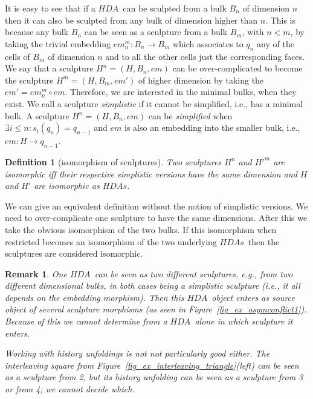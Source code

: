 \documentclass[submission,copyright,creativecommons]{eptcs}
\newtheorem{definition}[theorem]{Definition}
\newtheorem{remark}[theorem]{Remark}
\newcounter{case}
\newcommand\HDA{\ensuremath{\mathit{HDA}}}
\newcommand\HDAs{\ensuremath{\mathit{HDAs}}}
\newcommand\sculpture[2]{\ensuremath{#1^{#2}}}
\newcommand\embedMorphism{\ensuremath{\mathit{em}}}
\begin{document}
It is easy to see that if a \HDA\ can be sculpted from a bulk $B_{n}$ of dimension $n$ then it can also be sculpted from any bulk of dimension higher than $n$. This is because any bulk $B_{n}$ can be seen as a sculpture from a bulk $B_{m}$, with $n<m$, by taking the trivial embedding $\embedMorphism^{m}_{n}:B_{n}\rightarrow B_{m}$ which associates to $q_{n}$ any of the cells of $B_{m}$ of dimension $n$ and to all the other cells just the corresponding faces. We say that a sculpture $\sculpture{H}{n}=(H,B_{n},\embedMorphism)$ can be over-complicated to become the sculpture $\sculpture{H}{m}=(H,B_{m},\embedMorphism')$ of higher dimension by taking the $\embedMorphism'=\embedMorphism^{m}_{n}\circ\embedMorphism$.
Therefore, we are interested in the minimal bulks, when they exist. We call a sculpture \emph{simplistic} if it cannot be simplified, i.e., has a minimal bulk. A sculpture $\sculpture{H}{n}=(H,B_{n},\embedMorphism)$ can be \emph{simplified} when $\exists i\leq n: s_{i}(q_{n})=q_{n-1}$ and $\embedMorphism$ is also an embedding into the smaller bulk, i.e., $\embedMorphism:H\rightarrow q_{n-1}$.


\begin{definition}[isomorphism of sculptures]\label{def_iso_sculptures}
Two sculptures $\sculpture{H}{n}$ and $\sculpture{H'}{m}$ are isomorphic iff their respective simplistic versions have the same dimension and $H$ and $H'$ are isomorphic as \HDAs.
\end{definition}

We can give an equivalent definition without the notion of simplistic versions. We need to over-complicate one sculpture to have the same dimensions. After this we take the obvious isomorphism of the two bulks. If this isomorphism when restricted becomes an isomorphism of the two underlying \HDAs\ then the sculptures are considered isomorphic. 


\begin{remark}
One \HDA\ can be seen as two different sculptures, e.g., from two different dimensional bulks, in both cases being a simplistic sculpture (i.e., it all depends on the embedding morphism). Then this \HDA\ object enters as source object of several sculpture morphisms (as seen in Figure~\ref{fig_ex_asymconflict1}). Because of this we cannot determine from a \HDA\ alone in which sculpture it enters.

Working with history unfoldings is not not particularly good either. The interleaving square from Figure~\ref{fig_ex_interleaving_triangle}(left) can be seen as a sculpture from 2, but its history unfolding can be seen as a sculpture from 3 or from 4; we cannot decide which.
\end{remark}
\end{document}
